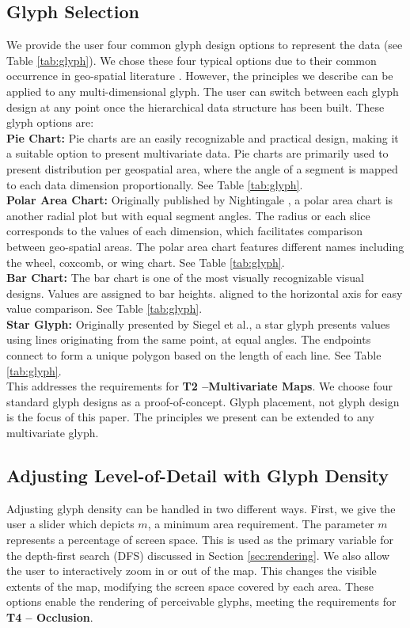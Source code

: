 \subsection{Glyph Selection} \label{sec:glyphSelect}


We provide the user four common glyph design options to represent the data (see Table \ref{tab:glyph}). We chose these four typical options due to their common occurrence in geo-spatial literature \cite{andrienko2006exploratory}. However, the principles we describe can be applied to any multi-dimensional glyph. The user can switch between each glyph design at any point once the hierarchical data structure has been built. These glyph options are:\\
\textbf{Pie Chart:} Pie charts are an easily recognizable and practical design, making it a suitable option to present multivariate data. Pie charts are primarily used to present distribution per geospatial area, where the angle of a segment is mapped to each data dimension proportionally. See Table \ref{tab:glyph}.\\
\textbf{Polar Area Chart:} Originally published by Nightingale \cite{nightingale1858notes}, a polar area chart is another radial plot but with equal segment angles. The radius or each slice corresponds to the values of each dimension, which facilitates comparison between geo-spatial areas. The polar area chart features different names including the wheel, coxcomb, or wing chart. See Table \ref{tab:glyph}. \\
\textbf{Bar Chart:} The bar chart is one of the most visually recognizable visual designs. Values are assigned to bar heights. aligned to the horizontal axis for easy value comparison. See Table \ref{tab:glyph}.\\
\textbf{Star Glyph:} Originally presented by Siegel et al.\cite{siegel1972surgical}, a star glyph presents values using lines originating from the same point, at equal angles. The endpoints connect to form a unique polygon based on the length of each line. See Table \ref{tab:glyph}.\\ This addresses the requirements for \textbf{T2 --Multivariate Maps}. We choose four standard glyph designs as a proof-of-concept. Glyph placement, not glyph design is the focus of this paper. The principles we present can be extended to any multivariate glyph.

\subsection{Adjusting Level-of-Detail with Glyph Density} \label{sec:scaleAdjust}
Adjusting glyph density can be handled in two different ways. First, we give the user a slider which depicts $m$, a minimum area requirement. The parameter $m$ represents a percentage of screen space. This is used as the primary variable for the depth-first search (DFS) discussed in Section \ref{sec:rendering}. We also allow the user to interactively zoom in or out of the map. This changes the visible extents of the map, modifying the screen space covered by each area. These options enable the rendering of perceivable glyphs, meeting the requirements for \textbf{T4 -- Occlusion}.

